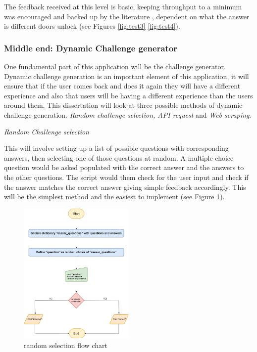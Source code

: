 \documentclass[12pt,a4paper]{article}
\begin{document}
The feedback received at this level is basic, keeping throughput to a minimum was encouraged and backed up by the literature \cite{bulling2016pervasive}, dependent on what the answer is different doors unlock (see Figures \ref{fig:test3} \ref{fig:test4}).



\subsubsection{Middle end: Dynamic Challenge generator}  
One fundamental part of this application will be the challenge generator. Dynamic challenge generation is an important element of this application, it will ensure that if the user comes back and does it again they will have a different experience and also that users will be having a different experience than the users around them. This dissertation will look at three possible methods of dynamic challenge generation. \emph{Random challenge selection, API request} and \emph{Web scraping}.  

\emph{Random Challenge selection} 

This will involve setting up a list of possible questions with corresponding answers, then selecting one of those questions at random. A multiple choice question would be asked populated with the correct answer and the answers to the other questions. The script would them check for the user input and check if the answer matches the correct answer giving simple feedback accordingly. This will be the simplest method and the easiest to implement (see Figure \ref{RandomSelection}).  

\begin{figure}[h]
    \centering
    \includegraphics[width=0.5\textwidth]{Figs/random_selection (1).png}
    \caption{random selection flow chart} 
    \label{RandomSelection}
\end{figure}   
\end{document}
